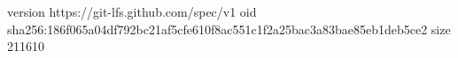 version https://git-lfs.github.com/spec/v1
oid sha256:186f065a04df792bc21af5cfe610f8ac551c1f2a25bac3a83bae85eb1deb5ce2
size 211610
